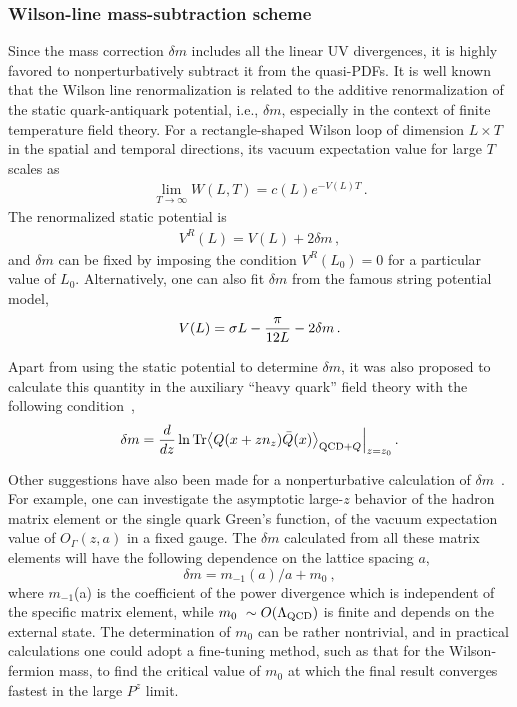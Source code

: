 \subsubsection{Wilson-line mass-subtraction scheme}
\label{sec:renorm-npr-mass}

Since the mass correction $\delta m$ includes all the linear UV divergences, it is highly favored to nonperturbatively subtract it from the quasi-PDFs. It is well known that the Wilson line renormalization is related to the additive renormalization of the static quark-antiquark potential, i.e., $\delta m$, especially in the context of finite temperature field theory. For a rectangle-shaped Wilson loop of dimension $L\times T$ in the spatial and temporal directions, its vacuum expectation value for large $T$ scales as
\begin{align}
	\lim_{T\to\infty}W(L,T) = c(L) e^{-V(L)T}\,.
\end{align}
The renormalized static potential is
\begin{align}\label{eq:deltam1}
	V^{R}(L) = V(L) + 2\delta m\,,
\end{align}
and $\delta m$ can be fixed by imposing the condition $V^{R}(L_0)=0$ for a particular value of $L_0$. Alternatively, one can also fit $\delta m$ from the famous string potential model,
\begin{align}\label{eq:deltam2}
	V(L) = \sigma L- {\pi \over 12 L} -2\delta m\,.
\end{align}

Apart from using the static potential to determine $\delta m$, it was also proposed to calculate this quantity in the auxiliary ``heavy quark'' field theory with the following condition~\cite{Green:2017xeu},
\begin{align}\label{eq:deltam3}
	\delta m = {d\over dz} \ln{\rm Tr}\big\langle Q(x+zn_z)\bar{Q}(x)\big\rangle_{{\rm QCD}+Q} \Big|_{z=z_0}\,.
\end{align}

Other suggestions have also been made for a nonperturbative calculation of $\delta m$~\cite{Ji:2020brr}. For example, one can investigate the asymptotic large-$z$ behavior of the hadron matrix element or the single quark Green's function, of the vacuum expectation value of $O_{\Gamma}(z,a)$ in a fixed gauge. The $\delta m$ calculated from all these matrix elements will have the following dependence
on the lattice spacing $a$,
\begin{equation}
	\delta m = m_{-1}(a)/a + m_0 \ ,
\end{equation}
where $m_{-1}$(a) is the coefficient of the power divergence which is independent of the specific matrix element, while $m_0~\sim O(\Lambda_{\rm QCD})$ is finite and depends on the external state.
The determination of $m_0$ can be rather nontrivial, and in practical calculations one could adopt a fine-tuning method, such as that for the Wilson-fermion mass, to find the critical value of $m_0$ at which the final result converges fastest in the large $P^z$ limit.

